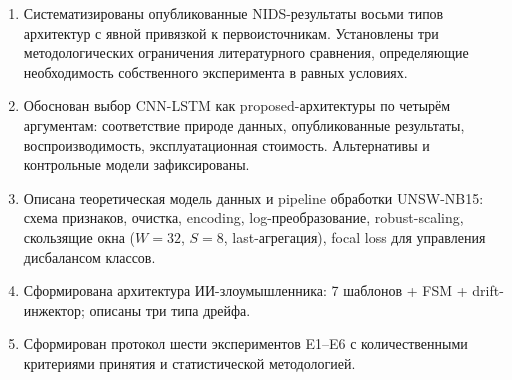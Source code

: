\begin{enumerate}
    \item Систематизированы опубликованные NIDS-результаты восьми
    типов архитектур с явной привязкой к первоисточникам.
    Установлены три методологических ограничения литературного
    сравнения, определяющие необходимость собственного эксперимента в
    равных условиях.
    \item Обоснован выбор CNN-LSTM как proposed-архитектуры по
    четырём аргументам: соответствие природе данных, опубликованные
    результаты, воспроизводимость, эксплуатационная стоимость.
    Альтернативы и контрольные модели зафиксированы.
    \item Описана теоретическая модель данных и pipeline обработки
    UNSW-NB15: схема признаков, очистка, encoding, log-преобразование,
    robust-scaling, скользящие окна (\(W=32\), \(S=8\), last-агрегация),
    focal loss для управления дисбалансом классов.
    \item Сформирована архитектура ИИ-злоумышленника:
    7 шаблонов + FSM + drift-инжектор; описаны три типа дрейфа.
    \item Сформирован протокол шести экспериментов E1--E6 с
    количественными критериями принятия и статистической методологией.
\end{enumerate}
